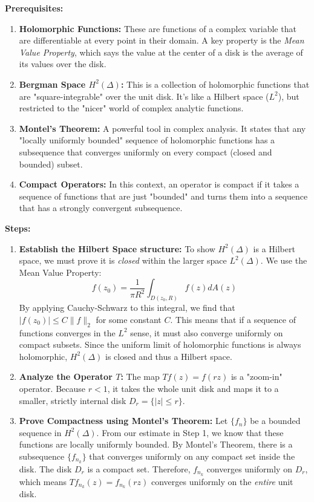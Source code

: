 \begin{solution}
\textbf{Prerequisites:}
\begin{enumerate}
    \item \textbf{Holomorphic Functions:} These are functions of a complex variable that are differentiable at every point in their domain. A key property is the \textit{Mean Value Property}, which says the value at the center of a disk is the average of its values over the disk.
    \item \textbf{Bergman Space $H^2(\Delta)$:} This is a collection of holomorphic functions that are "square-integrable" over the unit disk. It's like a Hilbert space ($L^2$), but restricted to the "nicer" world of complex analytic functions.
    \item \textbf{Montel's Theorem:} A powerful tool in complex analysis. It states that any "locally uniformly bounded" sequence of holomorphic functions has a subsequence that converges uniformly on every compact (closed and bounded) subset.
    \item \textbf{Compact Operators:} In this context, an operator is compact if it takes a sequence of functions that are just "bounded" and turns them into a sequence that has a strongly convergent subsequence.
\end{enumerate}

\textbf{Steps:}
\begin{enumerate}
    \item \textbf{Establish the Hilbert Space structure:}
        To show $H^2(\Delta)$ is a Hilbert space, we must prove it is \textit{closed} within the larger space $L^2(\Delta)$. We use the Mean Value Property:
        \[ f(z_0) = \frac{1}{\pi R^2} \int_{D(z_0, R)} f(z) dA(z) \]
        By applying Cauchy-Schwarz to this integral, we find that $|f(z_0)| \leq C \|f\|_2$ for some constant $C$. This means that if a sequence of functions converges in the $L^2$ sense, it must also converge uniformly on compact subsets. Since the uniform limit of holomorphic functions is always holomorphic, $H^2(\Delta)$ is closed and thus a Hilbert space.

    \item \textbf{Analyze the Operator $T$:}
        The map $Tf(z) = f(rz)$ is a "zoom-in" operator. Because $r < 1$, it takes the whole unit disk and maps it to a smaller, strictly internal disk $D_r = \{|z| \leq r\}$.

    \item \textbf{Prove Compactness using Montel's Theorem:}
        Let $\{f_n\}$ be a bounded sequence in $H^2(\Delta)$. From our estimate in Step 1, we know that these functions are locally uniformly bounded. By Montel's Theorem, there is a subsequence $\{f_{n_k}\}$ that converges uniformly on any compact set inside the disk. 
        The disk $D_r$ is a compact set. Therefore, $f_{n_k}$ converges uniformly on $D_r$, which means $Tf_{n_k}(z) = f_{n_k}(rz)$ converges uniformly on the \textit{entire} unit disk.


\end{enumerate}
\end{solution}

